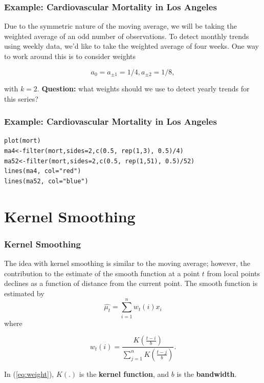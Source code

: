 \documentclass[%
xcolor=pdftex]{beamer}
\begin{document}
\begin{frame}
\frametitle{Example: Cardiovascular Mortality in Los Angeles}

Due to the symmetric nature of the moving average, we will be taking the weighted average of an odd number of observations. To detect monthly trends using weekly data, we'd like to take the weighted average of four weeks. One way to work around this is to consider weights

$$
a_0 = a_{\pm1} = 1/4, a_{\pm2} = 1/8,
$$

with $k=2$. \textbf{Question:} what weights should we use to detect yearly trends for this series?

\end{frame}

\begin{frame}[fragile]
\frametitle{Example: Cardiovascular Mortality in Los Angeles}

\begin{verbatim}
plot(mort)
ma4<-filter(mort,sides=2,c(0.5, rep(1,3), 0.5)/4)
ma52<-filter(mort,sides=2,c(0.5, rep(1,51), 0.5)/52)
lines(ma4, col="red")
lines(ma52, col="blue")
\end{verbatim}

\end{frame}

\section{Kernel Smoothing}
\frame{\tableofcontents[currentsection]}

\begin{frame}
\frametitle{Kernel Smoothing}

The idea with kernel smoothing is similar to the moving average; however, the contribution to the estimate of the smooth function at a point $t$ from local points declines as a function of distance from the current point.  The smooth function is estimated by
\begin{equation}
\hat{\mu_t}=\sum_{i=1}^n w_t(i) x_i
\end{equation}
where

\begin{equation} \label{eq:weight}
w_t(i)=\frac{K\left( \frac{t-i}{b} \right)}{ \sum_{j=1}^n K\left( \frac{t-j}{b} \right)}.
\end{equation}

In (\ref{eq:weight}), $K(.)$ is the \textbf{kernel function}, and $b$ is the \textbf{bandwidth}.

\end{frame}
\end{document}
